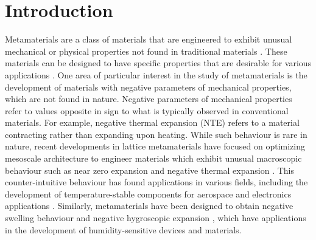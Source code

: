 \documentclass[final,times,5p]{elsarticle}
\numberwithin{equation}{section}
\begin{document}
\section{Introduction}
Metamaterials are a class of materials that are engineered to exhibit unusual mechanical or physical properties not found in traditional materials \citep{barchiesi2019mechanical,surjadi2019mechanical,ren2018auxetic}. These materials can be designed to have specific properties that are desirable for various applications \citep{LONG2021113429,xin20224d,wang2021compression,cheng2022design}. One area of particular interest in the study of metamaterials is the development of materials with negative parameters of mechanical properties, which are not found in nature. Negative parameters of mechanical properties refer to values opposite in sign to what is typically observed in conventional materials. For example, negative thermal expansion (NTE) refers to a material contracting rather than expanding upon heating. While such behaviour is rare in nature, recent developments in lattice metamaterials have focused on optimizing mesoscale architecture to engineer materials which exhibit unusual macroscopic behaviour such as near zero expansion \citep{xie2018double,rhein2011bimetallic,yamamoto2014thin} and negative thermal expansion \citep{miller2009negative,n2007connected,lakes1996cellular,lakes2007cellular,grima2010composites,grima2015maximizing,takezawa2017design,wu2016isotropic,wang2016lightweight,peng2021novel,shen2022novel}. This counter-intuitive behaviour has found applications in various fields, including the development of temperature-stable components for aerospace and electronics applications \citep{chen2021stiffness,wei2018lightweight,wei2018three,lifson2017enabling,yang2016soft}. Similarly, metamaterials have been designed to obtain negative swelling behaviour \citep{ma20224d,zhang2018soft,curatolo2018effective,liu2016harnessing,chen2021hydrogel,wei2020design} and negative hygroscopic expansion \citep{ma2022design,bai2022moisture,lim2019composite,lim2023metamaterial,lim2021adjustable}, which have applications in the development of humidity-sensitive devices and materials.
\end{document}
